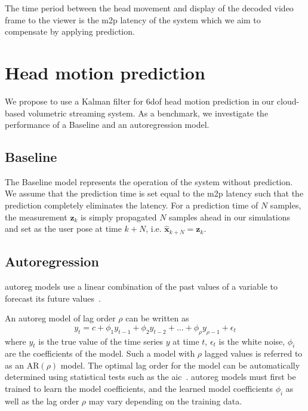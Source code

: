 \documentclass[sigconf]{acmart}			%
\begin{document}
The time period between the head movement and display of the decoded video frame to the viewer is the \gls{m2p} latency of the system which we aim to compensate by applying prediction.

\section{Head motion prediction}
\label{sec:prediction}
We propose to use a Kalman filter for \gls{6dof} head motion prediction in our cloud-based volumetric streaming system.
As a benchmark, we investigate the performance of a Baseline and an autoregression model.

\subsection{Baseline}
The Baseline model represents the operation of the system without prediction.
We assume that the prediction time is set equal to the \gls{m2p} latency such that the prediction completely eliminates the latency.
For a prediction time of $N$ samples, the measurement $\mathbf{z}_k$ is simply propagated $N$ samples ahead in our simulations and set as the user pose at time $k+N$, i.e. $\hat{\mathbf{x}}_{k+N}=\mathbf{z}_k$.

\subsection{Autoregression}
\label{sec:autoreg}
\Gls{autoreg} models use a linear combination of the past values of a variable to forecast its future values~\cite{hyndman2018}.

An \gls{autoreg}  model of lag order $\rho$ can be written as
\begin{equation}
	\label{eq:autoreg}
	y_t = c+\phi_1 y_{t-1}+\phi_2 y_{t-2}+\dots+\phi_\rho y_{\rho-1}+\epsilon_t
\end{equation}
where $y_t$ is the true value of the time series $y$ at time $t$, $\epsilon_t$ is the white noise, $\phi_i$ are the coefficients of the model.
Such a model with $\rho$ lagged values is referred to as an $\mathrm{AR}(\rho)$ model. 
The optimal lag order for the model can be automatically determined using statistical tests such as the \gls{aic}~\cite{akaike1973}.
\gls{autoreg} models must first be trained to learn the model coefficients, and the learned model coefficients $\phi_i$ as well as the lag order $\rho$ may vary depending on the training data.
\end{document}
